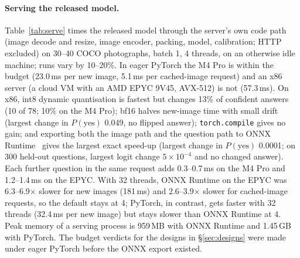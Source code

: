 \documentclass[10pt]{article}
\begin{document}
\paragraph{Serving the released model.} Table~\ref{tab:serve} times the released model through the server's own code path (image decode and resize, image encoder, packing, model, calibration; HTTP excluded) on 30--40 COCO photographs, batch 1, 4 threads, on an otherwise idle machine; runs vary by 10--20\%. In eager PyTorch the M4 Pro is within the budget (23.0\,ms per new image, 5.1\,ms per cached-image request) and an x86 server (a cloud VM with an AMD EPYC 9V45, AVX-512) is not (57.3\,ms). On x86, int8 dynamic quantisation is fastest but changes 13\% of confident answers (10 of 78; 10\% on the M4 Pro); bf16 halves new-image time with small drift (largest change in $P(\text{yes})$ 0.049, no flipped answer); \texttt{torch.compile} gives no gain; and exporting both the image path and the question path to ONNX Runtime~\cite{onnxruntime} gives the largest exact speed-up (largest change in $P(\text{yes})$ 0.0001; on 300 held-out questions, largest logit change $5\times10^{-4}$ and no changed answer). Each further question in the same request adds 0.3--0.7\,ms on the M4 Pro and 1.2--1.4\,ms on the EPYC. With 32 threads, ONNX Runtime on the EPYC was 6.3--6.9$\times$ slower for new images (181\,ms) and 2.6--3.9$\times$ slower for cached-image requests, so the default stays at 4; PyTorch, in contrast, gets faster with 32 threads (32.4\,ms per new image) but stays slower than ONNX Runtime at 4. Peak memory of a serving process is 959\,MB with ONNX Runtime and 1.45\,GB with PyTorch. The budget verdicts for the designs in \S\ref{sec:designs} were made under eager PyTorch before the ONNX export existed.
\end{document}
